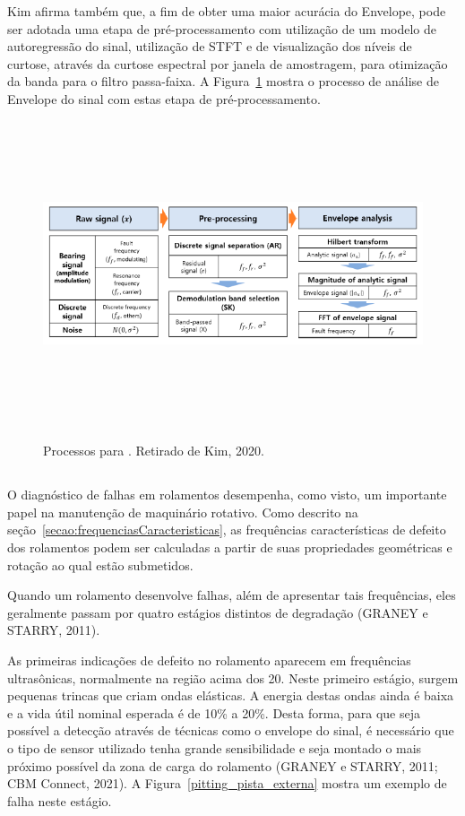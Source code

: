 \documentclass[
	12pt,				
	oneside,			
	a4paper,			
	english,			
	brazil,			
	]{abntex2ppgsi}
\begin{document}
Kim afirma também que, a fim de obter uma maior acurácia do Envelope, pode ser adotada uma etapa de pré-processamento com utilização de um modelo de autoregressão do sinal, utilização de STFT e de visualização dos níveis de curtose, através da curtose espectral por janela de amostragem, para otimização da banda para o filtro passa-faixa. A Figura~\ref{envelope_kim} mostra o processo de análise de Envelope do sinal com estas etapa de pré-processamento. 

\begin{figure}[H]
\centering
\caption {Processos para . Retirado de Kim, 2020.}
\includegraphics[width=\textwidth,height=90mm,keepaspectratio]{envelope_kim}
\label{envelope_kim}
\end{figure}

\subsection{}

O diagnóstico de falhas em rolamentos desempenha, como visto, um importante papel na manutenção de maquinário rotativo. Como descrito na seção~\ref{secao:frequenciasCaracteristicas}, as frequências características de defeito dos rolamentos podem ser calculadas a partir de suas propriedades geométricas e rotação ao qual estão submetidos. 

Quando um rolamento desenvolve falhas, além de apresentar tais frequências, eles geralmente passam por quatro estágios distintos de degradação (GRANEY e STARRY, 2011). 

As primeiras indicações de defeito no rolamento aparecem em frequências ultrasônicas, normalmente na região acima dos \SI{20}{\kilo{\hertz}}. Neste primeiro estágio, surgem pequenas trincas que criam ondas elásticas. A energia destas ondas ainda é baixa e a vida útil nominal esperada é de 10\% a 20\%. Desta forma, para que seja possível a detecção através de técnicas como o envelope do sinal, é necessário que o tipo de sensor utilizado tenha grande sensibilidade e seja montado o mais próximo possível da zona de carga do rolamento (GRANEY e STARRY, 2011; CBM Connect, 2021). A Figura~\ref{pitting_pista_externa} mostra um exemplo de falha neste estágio.
\end{document}
